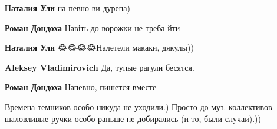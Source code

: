 \begin{itemize}
\begin{itemize}
 
\textbf{Наталия Ули} на певно ви дурепа)

 
\textbf{Роман Дондоха}
Навіть до ворожки не треба йти

 
\textbf{Наталия Ули} 😂😂😂😂Налетели макаки, дякулы))

 
\textbf{Aleksey Vladimirovich} Да, тупые рагули бесятся\Laughey[1.0][white].

 
\textbf{Роман Дондоха} Напевно, пишется вместе\Laughey[1.0][white]
\end{itemize}

 

Времена темников особо никуда не уходили.) Просто до муз. коллективов
шаловливые ручки особо раньше не добирались (и то, были случаи).))


 

\end{itemize}
